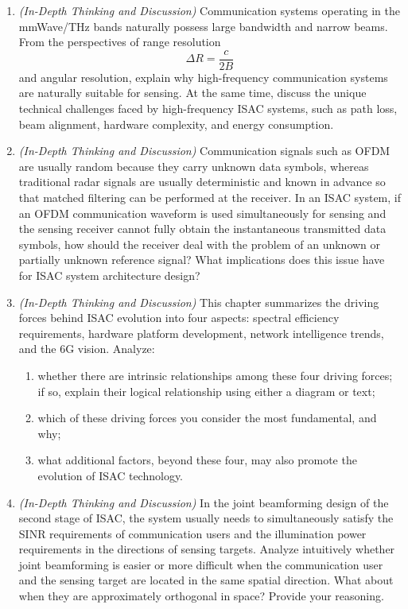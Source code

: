 \begin{enumerate}[label=\textbf{\arabic*.}, leftmargin=*]
    \item \textit{(In-Depth Thinking and Discussion)} Communication systems operating in the mmWave/THz bands naturally possess large bandwidth and narrow beams. From the perspectives of range resolution
    \[
        \Delta R = \frac{c}{2B}
    \]
    and angular resolution, explain why high-frequency communication systems are naturally suitable for sensing. At the same time, discuss the unique technical challenges faced by high-frequency ISAC systems, such as path loss, beam alignment, hardware complexity, and energy consumption.

    \item \textit{(In-Depth Thinking and Discussion)} Communication signals such as OFDM are usually random because they carry unknown data symbols, whereas traditional radar signals are usually deterministic and known in advance so that matched filtering can be performed at the receiver. In an ISAC system, if an OFDM communication waveform is used simultaneously for sensing and the sensing receiver cannot fully obtain the instantaneous transmitted data symbols, how should the receiver deal with the problem of an unknown or partially unknown reference signal? What implications does this issue have for ISAC system architecture design?

    \item \textit{(In-Depth Thinking and Discussion)} This chapter summarizes the driving forces behind ISAC evolution into four aspects: spectral efficiency requirements, hardware platform development, network intelligence trends, and the 6G vision. Analyze:
    \begin{enumerate}[label=(\alph*)]
        \item whether there are intrinsic relationships among these four driving forces; if so, explain their logical relationship using either a diagram or text;
        \item which of these driving forces you consider the most fundamental, and why;
        \item what additional factors, beyond these four, may also promote the evolution of ISAC technology.
    \end{enumerate}

    \item \textit{(In-Depth Thinking and Discussion)} In the joint beamforming design of the second stage of ISAC, the system usually needs to simultaneously satisfy the SINR requirements of communication users and the illumination power requirements in the directions of sensing targets. Analyze intuitively whether joint beamforming is easier or more difficult when the communication user and the sensing target are located in the same spatial direction. What about when they are approximately orthogonal in space? Provide your reasoning.


\end{enumerate}
